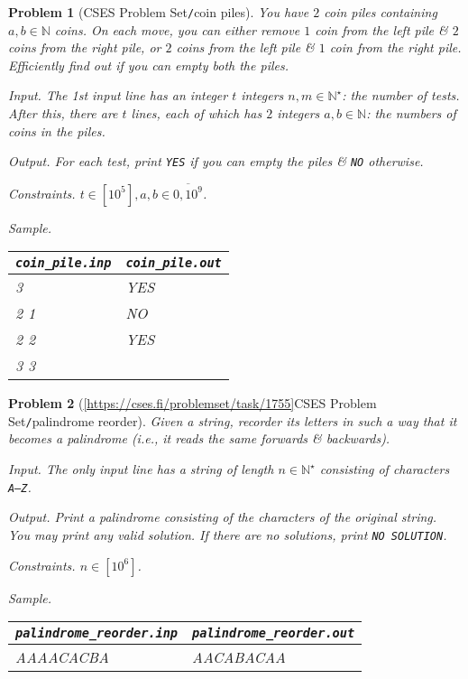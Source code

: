 \documentclass{article}
\newtheorem{problem}{Problem}
\begin{document}
\begin{problem}[CSES Problem Set{\tt/}coin piles]
    You have $2$ coin piles containing $a,b\in\mathbb{N}$ coins. On each move, you can either remove $1$ coin from the left pile \& $2$ coins from the right pile, or $2$ coins from the left pile \& $1$ coin from the right pile. Efficiently find out if you can empty both the piles.
    \item {\sf Input.} The 1st input line has an integer $t$ integers $n,m\in\mathbb{N}^\star$: the number of tests. After this, there are $t$ lines, each of which has $2$ integers $a,b\in\mathbb{N}$: the numbers of coins in the piles.
    \item {\sf Output.} For each test, print {\tt YES} if you can empty the piles \& {\tt NO} otherwise.
    \item {\sf Constraints.} $t\in[10^5],a,b\in\overline{0,10^9}$.
    \item {\sf Sample.}
    \begin{table}[H]
        \centering
        \begin{tabular}{|l|l|}
            \hline
            \verb|coin_pile.inp| & \verb|coin_pile.out| \\
            \hline
            3 & YES \\
            2 1 & NO \\
            2 2 & YES \\
            3 3 & \\
            \hline
        \end{tabular}
    \end{table}
\end{problem}

\begin{problem}[\ref{https://cses.fi/problemset/task/1755}{CSES Problem Set{\tt/}palindrome reorder}]
    Given a string, recorder its letters in such a way that it becomes a palindrome (i.e., it reads the same forwards \& backwards).
    \item {\sf Input.} The only input line has a string of length $n\in\mathbb{N}^\star$ consisting of characters {\tt A--Z}.
    \item {\sf Output.} Print a palindrome consisting of the characters of the original string. You may print any valid solution. If there are no solutions, print {\tt NO SOLUTION}.
    \item {\sf Constraints.} $n\in[10^6]$.
    \item {\sf Sample.}
    \begin{table}[H]
        \centering
        \begin{tabular}{|l|l|}
            \hline
            \verb|palindrome_reorder.inp| & \verb|palindrome_reorder.out| \\
            \hline
            AAAACACBA & AACABACAA \\
            \hline
        \end{tabular}
    \end{table}
\end{problem}
\end{document}
